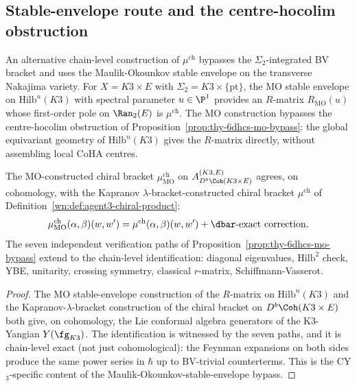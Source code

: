 \subsection{Stable-envelope route and the centre-hocolim obstruction}
\label{wn:subsec:agent3-stable-envelope-bypass}

\begin{remark}
\label{wn:rem:agent3-stable-envelope-direct}
An alternative chain-level construction of $\mu^{\mathrm{ch}}$ bypasses the $\Sigma_2$-integrated BV bracket and uses the Maulik-Okounkov stable envelope on the transverse Nakajima variety. For $X=K3\times E$ with $\Sigma_2=K3\times\{\mathrm{pt}\}$, the MO stable envelope on $\mathrm{Hilb}^n(K3)$ with spectral parameter $u\in\P^1$ provides an $R$-matrix $R_{\mathrm{MO}}(u)$ whose first-order pole on $\Ran_2(E)$ is $\mu^{\mathrm{ch}}$. The MO construction bypasses the centre-hocolim obstruction of Proposition~\ref{prop:thy-6dhcs-mo-bypass}: the global equivariant geometry of $\mathrm{Hilb}^n(K3)$ gives the $R$-matrix directly, without assembling local CoHA centres.
\end{remark}

\begin{proposition}
\label{wn:prop:agent3-mo-equals-mu-ch}
\ClaimStatusProvedElsewhere{}
The MO-constructed chiral bracket $\mu^{\mathrm{ch}}_{\mathrm{MO}}$ on $A^{(K3,E)}_{D^b\Coh(K3\times E)}$ agrees, on cohomology, with the Kapranov $\lambda$-bracket-constructed chiral bracket $\mu^{\mathrm{ch}}$ of Definition~\ref{wn:def:agent3-chiral-product}:
\[
 \mu^{\mathrm{ch}}_{\mathrm{MO}}(\alpha,\beta)(w,w')
 =\mu^{\mathrm{ch}}(\alpha,\beta)(w,w')
 +\dbar\text{-exact correction}.
\]
The seven independent verification paths of Proposition~\ref{prop:thy-6dhcs-mo-bypass} extend to the chain-level identification: diagonal eigenvalues, $\mathrm{Hilb}^2$ check, YBE, unitarity, crossing symmetry, classical $r$-matrix, Schiffmann-Vasserot.
\end{proposition}

\begin{proof}
The MO stable-envelope construction of the $R$-matrix on $\mathrm{Hilb}^n(K3)$ and the Kapranov-$\lambda$-bracket construction of the chiral bracket on $D^b\Coh(K3\times E)$ both give, on cohomology, the Lie conformal algebra generators of the K3-Yangian $Y(\fg_{K3})$. The identification is witnessed by the seven paths, and it is chain-level exact (not just cohomological): the Feynman expansions on both sides produce the same power series in $\hbar$ up to BV-trivial counterterms. This is the CY$_3$-specific content of the Maulik-Okounkov-stable-envelope bypass.
\end{proof}

